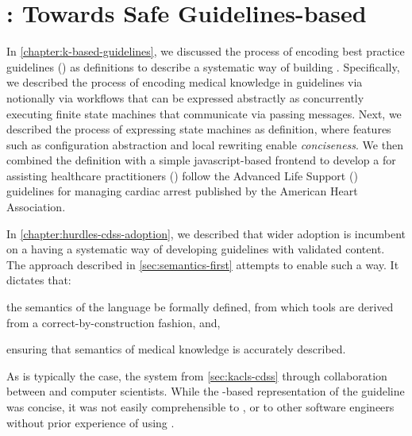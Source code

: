 \chapter{\MediK{}: Towards Safe Guidelines-based \CDSSs{}}

In \autoref{chapter:k-based-guidelines}, we discussed the process
of encoding best practice guidelines (\BPGs{}) as \K{} definitions
to describe a systematic way of building \CDSSs{}. Specifically,
we described the process of encoding medical knowledge in guidelines
via notionally via workflows that can be expressed abstractly as
concurrently executing finite state machines that communicate
via passing messages. Next, we described the process of
expressing state machines as \K{} definition, where \K{} features
such as configuration abstraction and local rewriting
enable \emph{conciseness}. We then combined the \K{} definition
with a simple javascript-based frontend to develop a \CDSS{}
for assisting healthcare practitioners (\HCPs{}) follow the
Advanced Life Support (\ALS{}) guidelines for managing
cardiac arrest published by the American Heart Association.

In \autoref{chapter:hurdles-cdss-adoption}, we described
that wider \CDSS{} adoption is incumbent on a having a
systematic way of developing guidelines with validated
content. The approach described in \autoref{sec:semantics-first}
attempts to enable such a way. It dictates that:
\begin{enumerate*}[label=(\roman*)]
  \item the semantics of the language be formally defined, from
  which tools are derived from a correct-by-construction fashion, and,
  \item ensuring that semantics of medical knowledge is accurately
  described.
\end{enumerate*}
As is typically the case, the \KACLS{} system from
\autoref{sec:kacls-cdss} through collaboration between
\HCPs{} and computer scientists. While the \K{}-based
representation of the \ALS{} guideline was concise,
it was not easily comprehensible to \HCPs{}, or to other
software engineers without prior experience of using \K{}.


